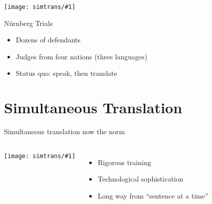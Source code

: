 \documentclass[compress]{beamer}
\newcommand{\gfxs}[2]{
\begin{center}
	\texttt{[image: simtrans/\#1]}
\end{center}
}
\begin{document}
\begin{frame}[plain]{}
\vspace*{-4cm}
 \gfxs{nuremberg_trials}{1.0}

\vspace{-4cm}

\begin{block}{N\"urnberg Trials}
    \begin{itemize}
        \item Dozens of defendants
        \item Judges from four nations (three languages)
        \item Status quo: speak, then translate
     \end{itemize}

\end{block}


\end{frame}


\section{Simultaneous Translation}

\begin{frame}{Simultaneous translation now the norm}

  \begin{columns}
       \gfxs{nuremberg_translators}{.9}
       \begin{itemize}
         \item Rigorous training
         \item Technological sophistication
         \item Long way from ``sentence at a time''
       \end{itemize}
  \end{columns}

\end{frame}
\end{document}
